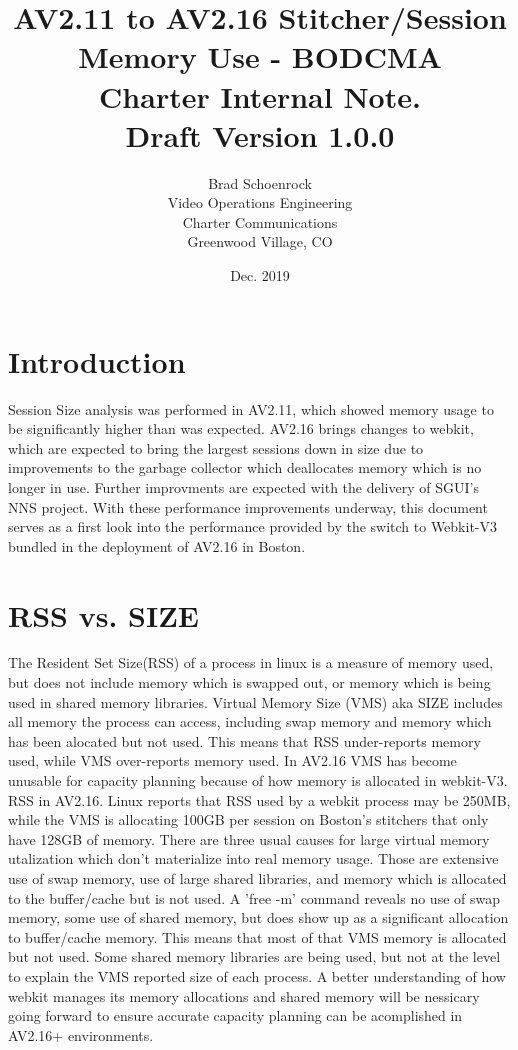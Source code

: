 \documentclass{article}
\author{Brad Schoenrock\\Video Operations Engineering\\Charter Communications\\Greenwood Village, CO}
\title{AV2.11 to AV2.16 Stitcher/Session Memory Use - BODCMA\\Charter Internal Note.\\Draft Version 1.0.0}
\date{Dec. 2019}
\begin{document}
\maketitle
\newpage

\tableofcontents
\newpage

\section{Introduction}
\label{SECTION-Introduction}

Session Size analysis was performed in AV2.11, which showed memory usage to be significantly higher than was expected. AV2.16 brings changes to webkit, which are expected to bring the largest sessions down in size due to improvements to the garbage collector which deallocates memory which is no longer in use. Further improvments are expected with the delivery of SGUI's NNS project. With these performance improvements underway, this document serves as a first look into the performance provided by the switch to Webkit-V3 bundled in the deployment of AV2.16 in Boston. 

\section{RSS vs. SIZE}
\label{SECTION-RSS}

The Resident Set Size(RSS) of a process in linux is a measure of memory used, but does not include memory which is swapped out, or memory which is being used in shared memory libraries. Virtual Memory Size (VMS) aka SIZE includes all memory the process can access, including swap memory and memory which has been alocated but not used. This means that RSS under-reports memory used, while VMS over-reports memory used. In AV2.16 VMS has become unusable for capacity planning because of how memory is allocated in webkit-V3. RSS in AV2.16. Linux reports that RSS used by a webkit process may be 250MB, while the VMS is allocating 100GB per session on Boston's stitchers that only have 128GB of memory. There are three usual causes for large virtual memory utalization which don't materialize into real memory usage. Those are extensive use of swap memory, use of large shared libraries, and memory which is allocated to the buffer/cache but is not used. A 'free -m' command reveals no use of swap memory, some use of shared memory, but does show up as a significant allocation to buffer/cache memory. This means that most of that VMS memory is allocated but not used. Some shared memory libraries are being used, but not at the level to explain the VMS reported size of each process. A better understanding of how webkit manages its memory allocations and shared memory will be nessicary going forward to ensure accurate capacity planning can be acomplished in AV2.16+ environments. 
\end{document}
